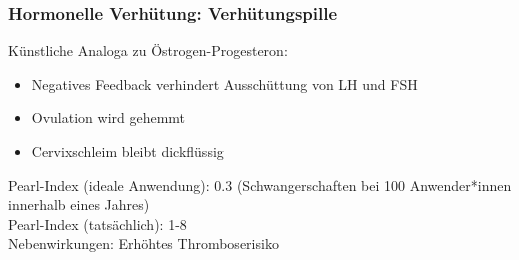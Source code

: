 \documentclass{beamer}
\begin{document}
{
\begin{frame}
\frametitle{Hormonelle Verhütung: Verhütungspille}

Künstliche Analoga zu Östrogen-Progesteron: \\
\begin{itemize}
\item
Negatives Feedback verhindert Ausschüttung von LH und FSH \\
\item
Ovulation wird gehemmt \\
\item
Cervixschleim bleibt dickflüssig \\[0.2 cm]
\end{itemize}

\pause

Pearl-Index (ideale Anwendung): 0.3 (Schwangerschaften bei 100 Anwender*innen innerhalb eines Jahres)\\
Pearl-Index (tatsächlich): 1-8 \\

Nebenwirkungen: Erhöhtes Thromboserisiko\\[4cm]





\end{frame}
}
\end{document}
